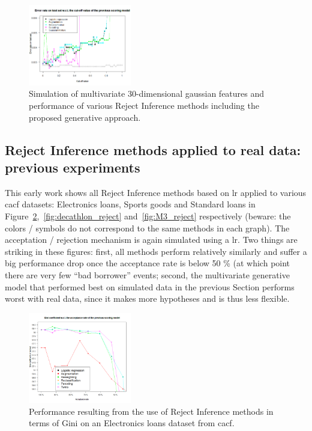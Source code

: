 \begin{figure}[H]
\centering
\includegraphics[width=0.4\textwidth]{figures/appendix/rejectinferencesimulation30var.png}
\caption{Simulation of multivariate 30-dimensional gaussian features and performance of various Reject Inference methods including the proposed generative approach.}
\label{fig:simu_30var}
\end{figure}


\subsection{Reject Inference methods applied to real data: previous experiments} \label{subsec:app_reject_real}

This early work shows all Reject Inference methods based on \gls{lr} applied to various \gls{cacf} datasets: Electronics loans, Sports goods and Standard loans in Figure~\ref{fig:darty_reject},~\ref{fig:decathlon_reject} and~\ref{fig:M3_reject} respectively (beware: the colors / symbols do not correspond to the same methods in each graph). The acceptation / rejection mechanism is again simulated using a \gls{lr}. Two things are striking in these figures: first, all methods perform relatively similarly and suffer a big performance drop once the acceptance rate is below 50 \% (at which point there are very few ``bad borrower'' events; second, the multivariate generative model that performed best on simulated data in the previous Section performs worst with real data, since it makes more hypotheses and is thus less flexible.

\begin{figure}[H]
\centering
\includegraphics[width=0.4\textwidth]{figures/appendix/rejectinferencedarty3.png}
\caption{Performance resulting from the use of Reject Inference methods in terms of Gini on an Electronics loans dataset from \gls{cacf}.}
\label{fig:darty_reject}
\end{figure}

